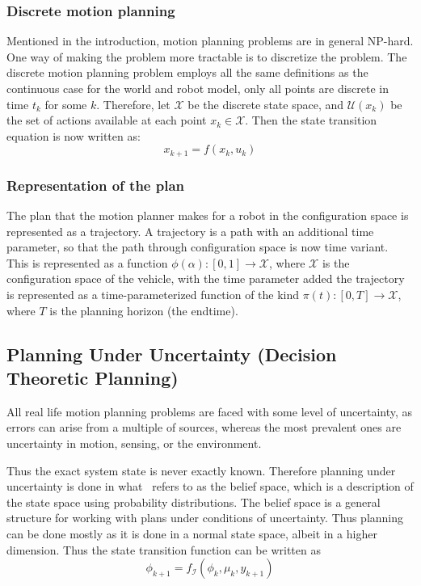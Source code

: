 \subsubsection{Discrete motion planning}

Mentioned in the introduction, motion planning problems are in general NP-hard.
One way of making the problem more tractable is to discretize the problem. The
discrete motion planning problem employs all the same definitions as the
continuous case for the world and robot model, only all points are discrete in
time \(t_k\) for some \(k\). Therefore, let \(\mathcal{X}\) be the discrete
state space, and \(\mathcal{U}(x_k)\) be the set of actions available at each
point \(x_k \in \mathcal{X}\). Then the state transition equation is now written
as:
\[
  x_{k+1} = f(x_k, u_k)
\]

\subsubsection{Representation of the plan}

The plan that the motion planner makes for a robot in the configuration space is
represented as a trajectory. A trajectory is a path with an additional time
parameter, so that the path through configuration space is now time variant.
This is represented as a function \(\phi(\alpha) \colon [0,1] \rightarrow
\mathcal{X}\), where \(\mathcal{X}\) is the configuration space of the vehicle,
with the time parameter added the trajectory is represented as a
time-parameterized function of the kind \(\pi(t) \colon [0,T] \rightarrow
\mathcal{X}\), where \(T\) is the planning horizon (\ie the endtime).

\subsection{Planning Under Uncertainty (Decision Theoretic Planning)}

All real life motion planning problems are faced with some level of uncertainty,
as errors can arise from a multiple of sources, whereas the most prevalent ones
are uncertainty in motion, sensing, or the environment.

Thus the exact system state is never exactly known. Therefore planning under
uncertainty is done in what~\cite[LaValle]{Lav06} refers to as the belief space,
which is a description of the state space using probability distributions. The
belief space is a general structure for working with plans under conditions of
uncertainty. Thus planning can be done mostly as it is done in a normal state
space, albeit in a higher dimension. Thus the state transition function can be
written as
\[
  \phi_{k+1} = f_{\mathcal{I}}\left( \phi_k, \mu_k, y_{k+1} \right)
\]

